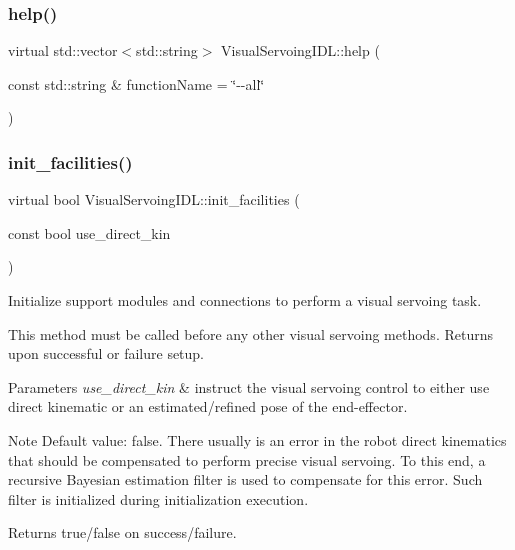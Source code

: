 \subsubsection{\texorpdfstring{help()}{help()}}
{\footnotesize\ttfamily virtual std\+::vector$<$std\+::string$>$ Visual\+Servoing\+I\+D\+L\+::help (\begin{DoxyParamCaption}\item[{const std\+::string \&}]{function\+Name = {\ttfamily \char`\"{}-\/-\/all\char`\"{}} }\end{DoxyParamCaption})\hspace{0.3cm}{\ttfamily [virtual]}}

\mbox{\label{classVisualServoingIDL_aae4ee4c07b50956396fd59bbb00fd9c7}} 
\subsubsection{\texorpdfstring{init\+\_\+facilities()}{init\_facilities()}}
{\footnotesize\ttfamily virtual bool Visual\+Servoing\+I\+D\+L\+::init\+\_\+facilities (\begin{DoxyParamCaption}\item[{const bool}]{use\+\_\+direct\+\_\+kin }\end{DoxyParamCaption})\hspace{0.3cm}{\ttfamily [virtual]}}



Initialize support modules and connections to perform a visual servoing task. 

This method must be called before any other visual servoing methods. Returns upon successful or failure setup. 
\begin{DoxyParams}{Parameters}
{\em use\+\_\+direct\+\_\+kin} & instruct the visual servoing control to either use direct kinematic or an estimated/refined pose of the end-\/effector. \\
\hline
\end{DoxyParams}
\begin{DoxyNote}{Note}
Default value\+: false. There usually is an error in the robot direct kinematics that should be compensated to perform precise visual servoing. To this end, a recursive Bayesian estimation filter is used to compensate for this error. Such filter is initialized during initialization execution. 
\end{DoxyNote}
\begin{DoxyReturn}{Returns}
true/false on success/failure. 
\end{DoxyReturn}


